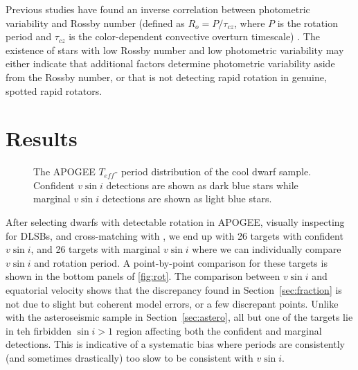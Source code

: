 \documentclass[manuscript]{aastex6}
\newcommand{\vsini}{\ensuremath{v \sin i}}
\newcommand{\Teff}{\ensuremath{T_{eff}}}
\begin{document}
Previous studies have found an inverse correlation between 
photometric variability and Rossby number (defined as \(R_o = P / \tau_{cz}\), where \(P\)
    is the rotation period and \(\tau_{cz}\) is the color-dependent 
convective overturn timescale) \citep{Messina01,Hartman09}. The existence of 
stars with low Rossby number and low photometric variability may either 
indicate that additional factors determine photometric variability 
aside from the Rossby number, or that \citet{McQuillan14} is not detecting 
rapid rotation in genuine, spotted rapid rotators.



\section{Results}
\label{sec:results}

\begin{figure*}
  \caption{\emph{Left:} APOGEE \vsini{} plotted against equatorial
  velocity computed from the rotation period and radius for targets with
  detected rapid rotation. The confirmed \vsini{} detections are shown
  in dark blue while the marginal \vsini{} detections are shown in light
  blue. The solid and dashed lines correspond to values where \(\sin i =
  1, 0.5\), respectively. The hatched area represents the forbidden
  region where \(\sin i > 1\). \emph{Right:} Symbols are similar to left
  side, except points are projected such that the DSEP-derived radius is
  plotted against the radius inferred from \vsini{} and rotation
  period.\label{fig:rot}}
\end{figure*}

\begin{figure}
  \caption{The APOGEE \Teff-\citet{McQuillan14} period distribution of the 
  cool dwarf sample. Confident \vsini{} detections are shown as dark blue
  stars while marginal \vsini{} detections are shown as light blue
  stars.\label{fig:periods}}
\end{figure}

After selecting dwarfs with detectable rotation in APOGEE,
visually inspecting for DLSBs, and cross-matching with \citet{McQuillan14}, we 
end up with 26 targets with confident \vsini{}, and 26 targets with marginal
\vsini{} where we can individually compare \vsini{} and rotation period. A 
point-by-point
comparison for these targets is shown in the bottom panels of
\cref{fig:rot}. The comparison between \vsini{} and equatorial velocity shows
that the discrepancy found in Section~\ref{sec:fraction} is not due to slight
but coherent model errors, or a few discrepant points. Unlike with the
asteroseismic sample in Section~\ref{sec:astero}, all but one of the targets
lie in teh firbidden \(\sin i > 1\) region affecting both the confident and
marginal detections. This is indicative of a systematic
bias where periods are consistently (and sometimes drastically) too slow to be
consistent with \vsini{}.
\end{document}
